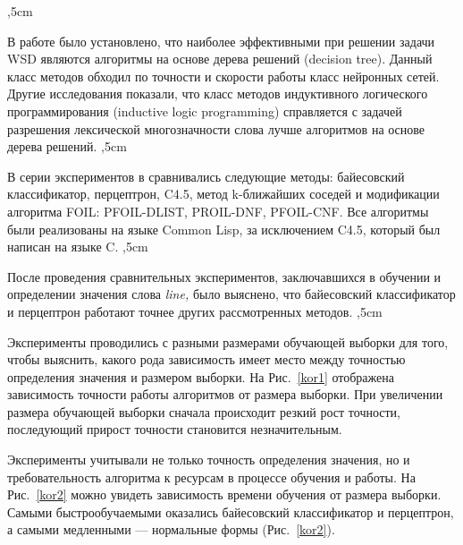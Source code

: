 \documentclass{article}
\begin{document}
\begin{articletext}
,5cm

В работе \cite{Charles 1993} было установлено, что наиболее эффективными при решении задачи WSD являются алгоритмы на основе дерева решений (decision tree). Данный класс методов обходил по точности и скорости работы класс нейронных сетей. Другие исследования \cite{Mooney 1995} показали, что класс методов индуктивного логического программирования (inductive logic programming) справляется с задачей разрешения лексической многозначности слова лучше алгоритмов на основе дерева решений. 
,5cm

В серии экспериментов в \cite{Mooney 1996} сравнивались следующие методы: байесовский классификатор, перцептрон, C4.5, метод k-ближайших соседей и модификации алгоритма FOIL: PFOIL-DLIST, PROIL-DNF, PFOIL-CNF. Все алгоритмы были реализованы на языке Common Lisp, за исключением C4.5, который был написан на языке C.
,5cm

После проведения сравнительных экспериментов, заключавшихся в обучении и определении значения слова \textit{line,} было выяснено, что байесовский классификатор и перцептрон работают точнее других рассмотренных методов. 
,5cm

Эксперименты проводились с разными размерами обучающей выборки для того, чтобы выяснить, какого рода зависимость имеет место между точностью определения значения и размером выборки. На Рис.~\ref{kor1} отображена зависимость точности работы алгоритмов от размера выборки. При увеличении размера обучающей выборки сначала происходит резкий рост точности, последующий прирост точности становится незначительным.

Эксперименты учитывали не только точность определения значения, но и требовательность алгоритма к ресурсам в процессе обучения и работы. На Рис.~\ref{kor2} можно увидеть зависимость времени обучения от размера выборки. Самыми быстрообучаемыми оказались байесовский классификатор и перцептрон, а самыми медленными --- нормальные формы (Рис.~\ref{kor2}).


\end{articletext}
\end{document}
